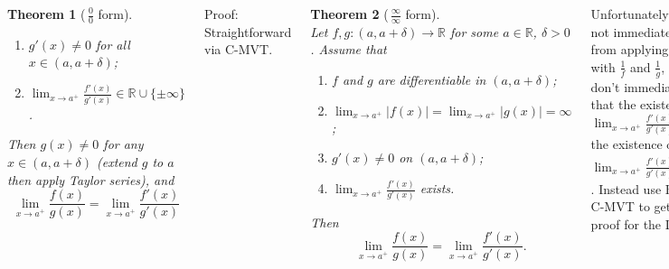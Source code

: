 \documentclass{tikzposter} %
\newtheorem{theorem}{Theorem}
\begin{document}
\begin{columns}
{\begin{theorem}[\,$\frac{0}{0}$ form]
\begin{enumerate}[label=\alph*)]
        \item $g'(x) \neq 0$ for all $x \in (a,a+\delta)$;
        \item $\displaystyle\lim_{x \to a^{+}} \frac{f'(x)}{g'(x)} \in \mathbb{R} \cup \{\pm \infty\}$.
      \end{enumerate}
    Then $g(x) \neq 0$ for any $x \in (a, a+\delta)$ (extend $g$ to $a$ then apply Taylor series), and
    \[
      \lim_{x \to a^{+}} \frac{f(x)}{g(x)} = \lim_{x \to a^{+}} \frac{f'(x)}{g'(x)}
    \]
  \end{theorem}
  Proof: Straightforward via C-MVT. \\
  \begin{theorem}[\,$\frac{\infty}{\infty}$ form] \hphantom{} \\
    Let $f, g : (a, a+\delta) \to \mathbb{R}$ for some $a \in \mathbb{R}$, $\delta > 0$. Assume that
    \begin{enumerate}[label=\alph*)]
      \item $f$ and $g$ are differentiable in $(a,a+\delta)$;
      \item $\displaystyle\lim_{x\to a^{+}} |f(x)| = \lim_{x \to a^{+}} |g(x)| = \infty$;
      \item $g'(x) \neq 0$ on $(a,a+\delta)$;
      \item $\displaystyle \lim_{x \to a^{+}} \frac{f'(x)}{g'(x)}$ exists.
    \end{enumerate}
    Then
    \[
      \lim_{x \to a^{+}} \frac{f(x)}{g(x)} = \lim_{x \to a^{+}} \frac{f'(x)}{g'(x)}.
    \]
  \end{theorem}
  Unfortunately this does not immediately follow from applying the above with $\frac{1}{f}$ and $\frac{1}{g}$, as we don't immediately have that the existence of $\displaystyle \lim_{x \to a^{+}} \frac{f'(x)}{g'(x)}$ implies the existence of $\displaystyle \lim_{x \to a^{+}} \frac{f'(x)}{g'(x)} \left(\frac{g(x)}{f(x)}\right)^{2}$. Instead use Rolle's and C-MVT to get an $\varepsilon$-$\delta$ proof for the LHS.
}
  \end{columns}
\end{document}
